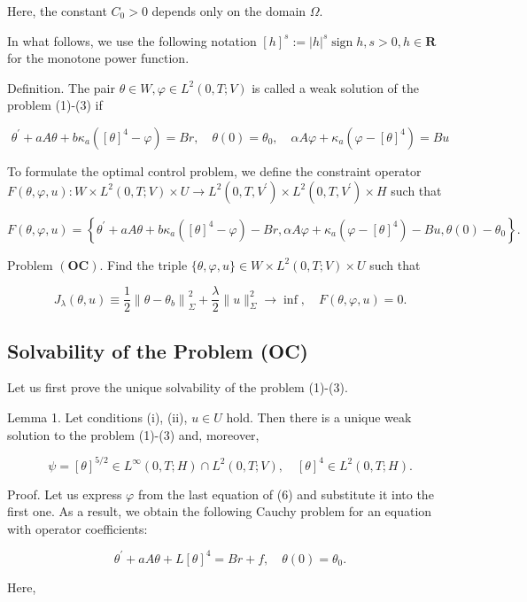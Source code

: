 Here, the constant $C_{0}>0$ depends only on the domain $\Omega$.

In what follows, we use the following notation $[h]^{s}:=|h|^{s} \operatorname{sign} h, s>0, h \in \mathbf{R}$ for the monotone power function.

Definition. The pair $\theta \in W, \varphi \in L^{2}(0, T ; V)$ is called a weak solution of the problem (1)-(3) if

$$
\theta^{\prime}+a A \theta+b \kappa_{a}\left([\theta]^{4}-\varphi\right)=B r, \quad \theta(0)=\theta_{0}, \quad \alpha A \varphi+\kappa_{a}\left(\varphi-[\theta]^{4}\right)=B u
$$

To formulate the optimal control problem, we define the constraint operator $F(\theta, \varphi, u): W \times L^{2}(0, T ; V) \times U \rightarrow L^{2}\left(0, T, V^{\prime}\right) \times L^{2}\left(0, T, V^{\prime}\right) \times H$ such that

$$
F(\theta, \varphi, u)=\left\{\theta^{\prime}+a A \theta+b \kappa_{a}\left([\theta]^{4}-\varphi\right)-B r, \alpha A \varphi+\kappa_{a}\left(\varphi-[\theta]^{4}\right)-B u, \theta(0)-\theta_{0}\right\} .
$$

Problem $(\mathbf{O C})$. Find the triple $\{\theta, \varphi, u\} \in W \times L^{2}(0, T ; V) \times U$ such that

$$
J_{\lambda}(\theta, u) \equiv \frac{1}{2}\left\|\theta-\theta_{b}\right\|_{\Sigma}^{2}+\frac{\lambda}{2}\|u\|_{\Sigma}^{2} \rightarrow \inf , \quad F(\theta, \varphi, u)=0 .
$$

\subsection{Solvability of the Problem (OC)}
Let us first prove the unique solvability of the problem (1)-(3).

Lemma 1. Let conditions (i), (ii), $u \in U$ hold. Then there is a unique weak solution to the problem (1)-(3) and, moreover,

$$
\psi=[\theta]^{5 / 2} \in L^{\infty}(0, T ; H) \cap L^{2}(0, T ; V), \quad[\theta]^{4} \in L^{2}(0, T ; H) .
$$

Proof. Let us express $\varphi$ from the last equation of (6) and substitute it into the first one. As a result, we obtain the following Cauchy problem for an equation with operator coefficients:

$$
\theta^{\prime}+a A \theta+L[\theta]^{4}=B r+f, \quad \theta(0)=\theta_{0} .
$$

Here,

